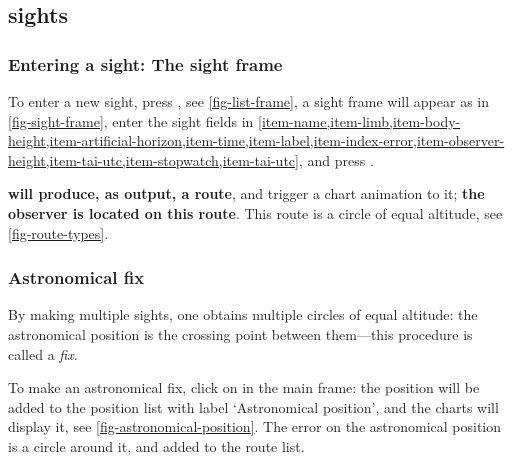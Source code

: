 \documentclass{ol-softwaremanual}
\begin{document}
\subsection{\Glspl{sight}}

\subsubsection{Entering a sight: The \gls{sight} frame}

To enter a new \gls{sight}, press  , see \cref{fig-list-frame}, a \gls{sight} frame will appear as in \cref{fig-sight-frame}, enter the \gls{sight} fields in  \cref{item-name,item-limb,item-body-height,item-artificial-horizon,item-time,item-label,item-index-error,item-observer-height,item-tai-utc,item-stopwatch,item-tai-utc}, and press . 

\textbf{\thel will produce, as output, a route}, and trigger a chart animation to it; \textbf{the observer is located  on this route}. This route is a circle of equal altitude, see \cref{fig-route-types}. 

\subsubsection{Astronomical fix}

By making multiple \glspl{sight}, one obtains multiple circles of equal altitude: the astronomical position is the crossing point between them---this procedure is called a \textit{fix}. 

To make an astronomical fix, click on  in the main frame: the position will be added to the position list with label `Astronomical position', and the charts will display it, see \cref{fig-astronomical-position}. The error on the astronomical position is a circle around it, and added to the route list. 
\end{document}
